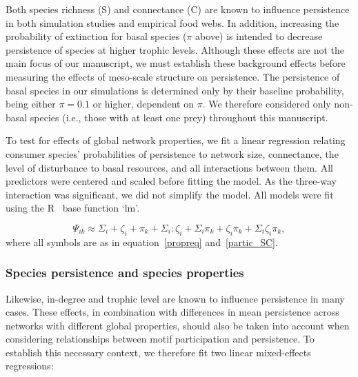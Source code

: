 \documentclass[12pt]{article}
\begin{document}
\begin{spacing}{2.0}
            Both species richness (S) and connectance (C) are known to influence persistence in both simulation studies and empirical food webs.
            In addition, increasing the probability of extinction for basal species ($\pi$ above) is intended to decrease persistence of species at higher trophic levels.
            Although these effects are not the main focus of our manuscript, we must establish these background effects before measuring the effects of meso-scale structure on persistence.
            The persistence of basal species in our simulations is determined only by their baseline probability, being either $\pi = 0.1$ or higher, dependent on $\pi$.
            We therefore considered only non-basal species (i.e., those with at least one prey) throughout this manuscript.

            To test for effects of global network properties, we fit a linear regression relating consumer species' probabilities of persistence to network size, connectance, the level of disturbance to basal resources, and all interactions between them. 
            All predictors were centered and scaled before fitting the model. 
            As the three-way interaction was significant, we did not simplify the model.
            All models were fit using the R~\citep{R} base function `lm'.


            \begin{equation}
                \Psi_{ik} \approx \Sigma_{i} + \zeta_{i} + \pi_{k} + \Sigma_{i}:\zeta_{i} + \Sigma_{i}\pi_{k} + \zeta_{i}\pi_{k} + \Sigma_{i}\zeta_{i}\pi_{k},
                \label{SCeq}
            \end{equation}
            where all symbols are as in equation~\ref{propreq} and~\ref{partic_SC}.
                  

        \subsubsection{Species persistence and species properties}
    
            Likewise, in-degree and trophic level are known to influence persistence in many cases.
            These effects, in combination with differences in mean persistence across networks with different global properties, should also be taken into account when considering relationships between motif participation and persistence.
            To establish this necessary context, we therefore fit two linear mixed-effects regressions:


\end{spacing}
\end{document}

